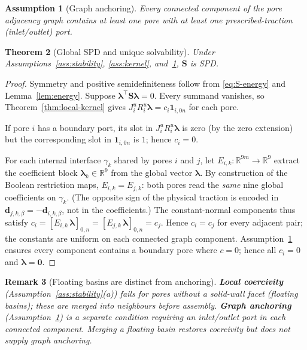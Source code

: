 \documentclass[11pt,a4paper]{article}
\newtheorem{assumption}{Assumption}[section]
\newtheorem{theorem}[assumption]{Theorem}
\newtheorem{remark}[assumption]{Remark}
\newcommand{\R}{\mathbb{R}}
\newcommand{\iface}{\gamma}
\newcommand{\trac}{\bm{\lambda}}
\newcommand{\Schur}{\mathbf{S}}
\newcommand{\one}{\mathbf{1}}
\newcommand{\zero}{\bm{0}}
\begin{document}
\begin{assumption}[Graph anchoring]\label{ass:anchor}
  Every connected component of the pore adjacency graph contains at least
  one pore with at least one prescribed-traction (inlet/outlet) port.
\end{assumption}

\begin{theorem}[Global SPD and unique solvability]\label{thm:SPD}
  Under Assumptions~\ref{ass:stability}, \ref{ass:kernel},
  and~\ref{ass:anchor}, $\Schur$ is SPD.
\end{theorem}

\begin{proof}
  Symmetry and positive semidefiniteness follow from
  \eqref{eq:S-energy} and Lemma~\ref{lem:energy}.
  Suppose $\trac^\top\Schur\trac = 0$.  Every summand vanishes, so
  Theorem~\ref{thm:local-kernel} gives
  $J_i^u R_i^u \trac = c_i \one_{i,0n}$ for each pore.

  If pore $i$ has a boundary port, its slot in $J_i^u R_i^u \trac$ is
  zero (by the zero extension) but the corresponding slot in
  $\one_{i,0n}$ is $1$; hence $c_i = 0$.

  For each internal interface $\iface_k$ shared by pores $i$ and $j$,
  let $E_{i,k} : \R^{9m} \to \R^9$ extract the coefficient block
  $\trac_k \in \R^9$ from the global vector $\trac$.
  By construction of the Boolean restriction maps,
  $E_{i,k} = E_{j,k}$: both pores read the \emph{same} nine global
  coefficients on $\iface_k$.  (The opposite sign of the physical
  traction is encoded in $\bm{d}_{j,k,\beta} = -\bm{d}_{i,k,\beta}$,
  not in the coefficients.)
  The constant-normal components thus satisfy
  $c_i = [E_{i,k}\,\trac]_{0,n} = [E_{j,k}\,\trac]_{0,n} = c_j$.
  Hence $c_i = c_j$ for every adjacent pair; the constants are uniform
  on each connected graph component.
  Assumption~\ref{ass:anchor} ensures every component contains a
  boundary pore where $c=0$; hence all $c_i=0$ and $\trac=\zero$.
\end{proof}

\begin{remark}[Floating basins are distinct from anchoring]\label{rem:floating}
  \textbf{Local coercivity} (Assumption~\ref{ass:stability}(a)) fails for
  pores without a solid-wall facet (\emph{floating basins}); these are
  merged into neighbours before assembly.
  \textbf{Graph anchoring} (Assumption~\ref{ass:anchor}) is a separate
  condition requiring an inlet/outlet port in each connected component.
  Merging a floating basin restores coercivity but does \emph{not} supply
  graph anchoring.
\end{remark}
\end{document}
